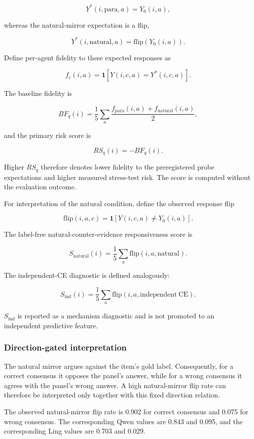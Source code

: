 \documentclass[11pt]{article}
\begin{document}
\[
Y^*(i,\mathrm{para},a)=Y_0(i,a),
\]

whereas the natural-mirror expectation is a flip,

\[
Y^*(i,\mathrm{natural},a)=\mathrm{flip}(Y_0(i,a)).
\]

Define per-agent fidelity to these expected responses as

\[
f_c(i,a)
=
\mathbf{1}
[
Y(i,c,a)=Y^*(i,c,a)
].
\]

The baseline fidelity is

\[
BF_q(i)
=
\frac{1}{5}
\sum_a
\frac{
f_{\mathrm{para}}(i,a)
+
f_{\mathrm{natural}}(i,a)
}{2},
\]

and the primary risk score is

\[
RS_q(i)=-BF_q(i).
\]

Higher \(RS_q\) therefore denotes lower fidelity to the preregistered probe expectations and higher measured stress-test risk. The score is computed without the evaluation outcome.

For interpretation of the natural condition, define the observed response flip

\[
\mathrm{flip}(i,a,c)
=
\mathbf{1}
[
Y(i,c,a)\ne Y_0(i,a)
].
\]

The label-free natural-counter-evidence responsiveness score is

\[
S_{\mathrm{natural}}(i)
=
\frac{1}{5}
\sum_a
\mathrm{flip}(i,a,\mathrm{natural}).
\]

The independent-CE diagnostic is defined analogously:

\[
S_{\mathrm{ind}}(i)
=
\frac{1}{5}
\sum_a
\mathrm{flip}(i,a,\mathrm{independent\ CE}).
\]

\(S_{\mathrm{ind}}\) is reported as a mechanism diagnostic and is not promoted to an independent predictive feature.

\subsubsection{Direction-gated interpretation}

The natural mirror argues against the item's gold label. Consequently, for a correct consensus it opposes the panel's answer, while for a wrong consensus it agrees with the panel's wrong answer. A high natural-mirror flip rate can therefore be interpreted only together with this fixed direction relation.

The observed natural-mirror flip rate is 0.902 for correct consensus and 0.075 for wrong consensus. The corresponding Qwen values are 0.843 and 0.095, and the corresponding Ling values are 0.703 and 0.029.
\end{document}
